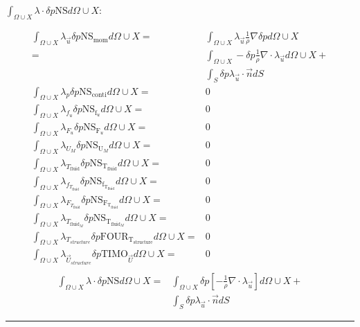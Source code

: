 \documentclass[10pt]{article} %
\begin{document}
\begin{center}
\begin{flushleft}
	$\int_{\Omega \cup X} \lambda \cdot \delta p \text{NS}d\Omega \cup X:$
\end{flushleft}
\begin{align*}
	\int_{\Omega \cup X} \lambda_{\vec{u}} \delta p \text{NS}_{\text{mom}} d\Omega \cup X  
	=& \int_{\Omega \cup X} \lambda_{\vec{u}} \frac{1}{\rho} \nabla \delta p d\Omega \cup X \\
	=& \int_{\Omega \cup X} - \delta p \frac{1}{\rho} \nabla \cdot \lambda_{\vec{u}} d\Omega \cup X + \\
	 &\int_{S} \delta p \lambda_{\vec{u}} \cdot \vec{n} dS\\
	\int_{\Omega \cup X} \lambda_p \delta p \text{NS}_{\text{conti}} d\Omega \cup X =& 0\\
	\int_{\Omega \cup X} \lambda_{f_u} \delta p \text{NS}_{\text{f}_u} d\Omega \cup X =& 0\\
	\int_{\Omega \cup X} \lambda_{F_u} \delta p \text{NS}_{\text{F}_u} d\Omega \cup X =& 0\\
	\int_{\Omega \cup X} \lambda_{U_M} \delta p \text{NS}_{\text{U}_M} d\Omega \cup X =& 0\\
	\int_{\Omega \cup X} \lambda_{T_{\text{fluid}}} \delta p \text{NS}_{\text{T}_{\text{fluid}}} d\Omega \cup X =& 0\\
	\int_{\Omega \cup X} \lambda_{f_{T_{\text{fluid}}}} \delta p \text{NS}_{\text{f}_{\text{T}_{\text{fluid}}}} d\Omega \cup X =& 0\\
	\int_{\Omega \cup X} \lambda_{F_{T_{\text{fluid}}}} \delta p \text{NS}_{\text{F}_{\text{T}_{\text{fluid}}}} d\Omega \cup X =& 0\\
	\int_{\Omega \cup X} \lambda_{T_{\text{fluid}_M}} \delta p \text{NS}_{\text{T}_{\text{fluid}_M}} d\Omega \cup X =& 0\\
	\int_{\Omega \cup X} \lambda_{T_{structure}} \delta p \text{FOUR}_{\text{T}_{\text{structure}}} d\Omega \cup X =& 0\\
	\int_{\Omega \cup X} \lambda_{\vec{U}_{structure}} \delta p \text{TIMO}_{\vec{U}} d\Omega \cup X =& 0\\
\end{align*}
\begin{align*}
	\int_{\Omega \cup X} \lambda \cdot \delta p \text{NS}d\Omega \cup X 
	=&\int_{\Omega \cup X} \delta p \left[ -\frac{1}{\rho} \nabla \cdot \lambda_{\vec{u}}\right] d\Omega \cup X + \\
	&\int_{S} \delta p \lambda_{\vec{u}} \cdot \vec{n} dS
\end{align*}
\noindent\rule[1ex]{\textwidth}{1pt}

\end{center}
\end{document}
